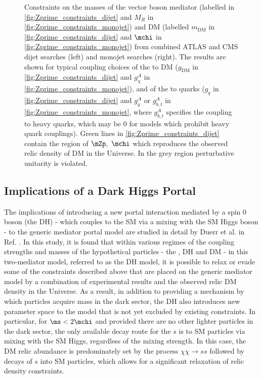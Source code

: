 \begin{figure}[hp]
	\caption{Constraints on the masses of the \Zprime vector boson mediator (labelled \mZp in \ref{fig:Zprime_constraints_dijet} and \(M_R\) in \ref{fig:Zprime_constraints_monojet}) and DM (labelled \(m_\text{DM}\) in \ref{fig:Zprime_constraints_dijet} and \(\mchi\) in \ref{fig:Zprime_constraints_monojet}) from combined ATLAS and CMS dijet searches \cite{Zprime_portal_monojet_dijet} (left) and monojet searches \cite{Zprime_portal_monojet_dijet} (right). The results are shown for typical coupling choices of the \Zprime to DM (\(g_\text{DM}\) in \ref{fig:Zprime_constraints_dijet} and \(g^A_\chi\) in \ref{fig:Zprime_constraints_monojet}), and of the \Zprime to quarks (\(g_q\) in \ref{fig:Zprime_constraints_dijet} and \(g^A_q\) or  \(g^A_{b,t}\) in \ref{fig:Zprime_constraints_monojet}, where \(g^A_{b,t}\) specifies the coupling to heavy quarks, which may be 0 for models which prohibit heavy quark couplings). Green lines in \ref{fig:Zprime_constraints_dijet} contain the region of \(\mZp, ~\mchi\) which reproduces the observed relic density of DM in the Universe. In the grey region perturbative unitarity \cite{Zprime_portal_monojet_dijet} is violated.}
	\label{fig:Feynman_Zprime}
\end{figure}

\subsection{Implications of a Dark Higgs Portal}

The implications of introducing a new portal interaction mediated by a spin 0 boson (the DH) - which couples to the SM via a mixing with the SM Higgs boson - to the generic \Zprime mediator portal model are studied in detail by Duerr et al. in Ref. \cite{Duerr_2016}. In this study, it is found that within various regimes of the coupling strengths and masses of the hypothetical particles - the \Zprime, DH and DM - in this two-mediator model, referred to as the DH model, it is possible to relax or evade some of the constraints described above that are placed on the generic \Zprime mediator model by a combination of experimental results and the observed relic DM density in the Universe. As a result, in addition to providing a mechanism by which particles acquire mass in the dark sector, the DH also introduces new parameter space to the model that is not yet excluded by existing constraints. In particular, for \(\ms < 2\mchi\) and provided there are no other lighter particles in the dark sector, the only available decay route for the \(s\) is to SM particles via mixing with the SM Higgs, regardless of the mixing strength. In this case, the DM relic abundance is predominately set by the process \(\chi\chi\rightarrow ss\) followed by decays of \(s\) into SM particles, which allows for a significant relaxation of relic density constraints. 

